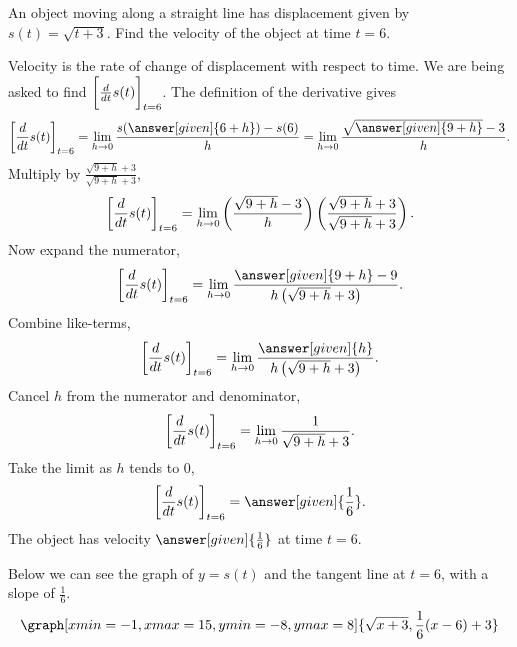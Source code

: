 \documentclass{ximera}
\begin{document}
\begin{example}
  An object moving along a straight line has displacement given by
  $s(t) = \sqrt{t+3}$.  Find the velocity of the object at time $t=6$.
  \begin{explanation}
    Velocity is the rate of change of displacement with respect to
    time.  We are being asked to find $\bigg[ \frac{\mathop{}\!d }{\mathop{}\!d t} s(t) \bigg]_{t=6}$.  The
    definition of the derivative gives
    \[
    \eval{\dd{t} s(t)}_{t=6} = \lim_{h \to 0} \frac{s(\answer[given]{6+h})-s(6)}{h} = \lim_{h\to 0} \frac{\sqrt{\answer[given]{9+h}}-3}{h}.
    \]
    Multiply by $\frac{\sqrt{9+h}+3}{\sqrt{9+h}+3}$,
    \[
    \bigg[ \frac{\mathop{}\!d }{\mathop{}\!d t} s(t) \bigg]_{t=6} = \lim_{h\to 0} \left(\frac{\sqrt{9+h}-3}{h} \right)\left( \frac{\sqrt{9+h}+3}{\sqrt{9+h}+3} \right).
    \]		
    Now expand the numerator,
    \[
    \eval{\dd{t} s(t)}_{t=6} = \lim_{h \to 0} \frac{\answer[given]{9+h} - 9}{h\left(\sqrt{9+h}+3 \right)}.
    \]
    Combine like-terms,
    \[
    \eval{\dd{t} s(t)}_{t=6} = \lim_{h \to 0} \frac{\answer[given]{h}}{h\left(\sqrt{9+h}+3\right)}.
    \]
    Cancel $h$ from the numerator and denominator,
    \[
    \bigg[ \frac{\mathop{}\!d }{\mathop{}\!d t} s(t) \bigg]_{t=6} = \lim_{h\to 0} \frac{1}{\sqrt{9+h}+3}.
    \]
    Take the limit as $h$ tends to $0$,
    \[
    \eval{\dd{t} s(t)}_{t=6} = \answer[given]{\frac{1}{6}}.
    \]
    The object has velocity $\answer[given]{\frac{1}{6}}$ at time $t=6$.
	\begin{onlineOnly}
	Below we can see the graph of $y=s(t)$ and the tangent line at $t=6$, with a slope of $\frac{1}{6}$. 
	\[
	\graph[xmin=-1,xmax=15,ymin=-8,ymax=8]{\sqrt{x+3}, \frac{1}{6}(x-6)+3}
	\]
	\end{onlineOnly}
	\end{explanation}
\end{example}
\end{document}

